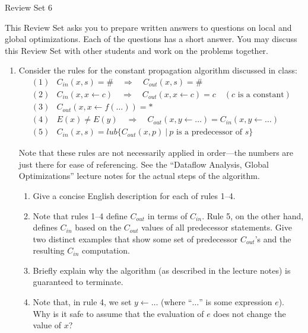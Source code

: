 \documentclass[12pt]{article} \usepackage{color} \usepackage{amsmath} \usepackage{amssymb}
\begin{document}
\begin{center}
{\large Review Set 6} 
\end{center}

This Review Set asks you to prepare written answers to questions on
local and global optimizations. Each of the questions has a short
answer. You may discuss this Review Set with other students and work
on the problems together. 

\begin{enumerate}
\item{ Consider the rules for the constant propagation algorithm discussed in class:
\begin{equation*}
\begin{array}{cl}
(1) & C_{in}(x, s) = \#{} \quad \Rightarrow \quad C_{out}(x, s) = \#{} \\
(2) & C_{in}(x, x \leftarrow c) \quad \Rightarrow \quad C_{out}(x, x \leftarrow c) = c \quad (c \text{ is a constant})\\
(3) & C_{out}(x, x \leftarrow f(\ldots)) = * \\
(4) & E(x) \neq E(y) \quad \Rightarrow \quad C_{out}(x, y \leftarrow \ldots) = C_{in}(x, y \leftarrow \ldots) \\
(5) & C_{in}(x,s) = lub \{ C_{out}(x, p) \ | \ p \text{ is a predecessor of } s \}
\end{array}
\end{equation*}

Note that these rules are not necessarily applied in order---the
numbers are just there for ease of referencing. See the
``Dataflow Analysis, Global Optimizations'' lecture notes for the actual steps
of the algorithm.

\begin{enumerate}
\item Give a concise English description for each of rules 1--4.
\item Note that rules 1--4 define $C_{out}$ in terms of $C_{in}$. Rule 5,
on the other hand, defines $C_{in}$ based on the $C_{out}$ values of
all predecessor statements. Give two distinct examples that show some set of
predecessor $C_{out}$'s and the resulting $C_{in}$ computation.
\item Briefly explain why the algorithm (as described in the lecture notes) is
guaranteed to terminate.
\item Note that, in rule 4, we set $y \leftarrow \ldots$ (where
``$\ldots$'' is some expression $e$). Why is it safe to assume that the
evaluation of $e$ does not change the value of $x$?
\end{enumerate}
}


\end{enumerate}
\end{document}
